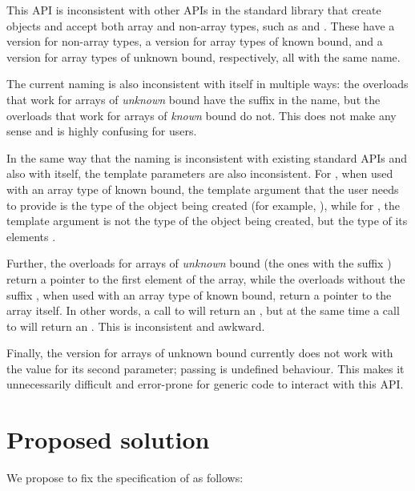 This API is inconsistent with other APIs in the standard library that create objects and accept both array and non-array types, such as  and . These have a version for non-array types, a version for array types of known bound, and a version for array types of unknown bound, respectively, all with the same name.

The current naming is also inconsistent with itself in multiple ways: the overloads that work for arrays of \emph{unknown} bound have the suffix  in the name, but the overloads that work for arrays of \emph{known} bound do not. This does not make any sense and is highly confusing for users.

In the same way that the naming is inconsistent with existing standard APIs and also with itself, the template parameters are also inconsistent. For , when used with an array type  of known bound, the template argument that the user needs to provide is the type  of the object being created (for example, ), while for , the template argument is not the type  of the object being created, but the type of its elements .

Further, the overloads for arrays of \emph{unknown} bound (the ones with the suffix ) return a pointer to the first element of the array, while the overloads without the suffix , when used with an array type of known bound, return a pointer to the array itself. In other words, a call to  will return an , but at the same time a call to  will return an . This is inconsistent and awkward.

Finally, the version for arrays of unknown bound currently does not work with the value  for its second parameter; passing  is undefined behaviour. This makes it unnecessarily difficult and error-prone for generic code to interact with this API.
\section{Proposed solution}
\label{sec:solution}

We propose to fix the specification of  as follows:

